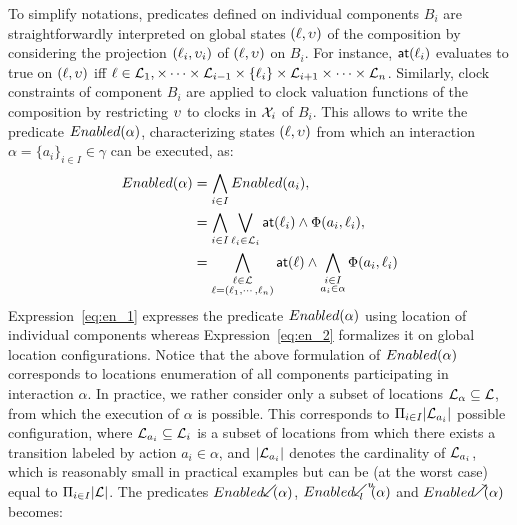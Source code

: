 To simplify notations, predicates defined on individual components $B_i$ are
straightforwardly interpreted on global states $(\ell,\upsilon)$ of the composition
by considering the projection $(\ell_i,\upsilon_i)$ of $(\ell,\upsilon)$ on $B_i$.
For instance, $\textsf{at}(\ell_i)$ evaluates to true on $(\ell,\upsilon)$ iff
$\ell\in\mathcal{L}_1,\times\cdots\times\mathcal{L}_{i-1}\times\{\ell_i\}\times\mathcal{L}_{i+1}\times
\cdots\times\mathcal{L}_n$. Similarly, clock constraints of component $B_i$ are applied to clock 
valuation functions of the composition
by restricting $\upsilon$ to clocks in $\mathcal{X}_i$ of $B_i$. This allows to write
the predicate $Enabled(\alpha)$, characterizing states $(\ell,\upsilon)$ from which 
an interaction $\alpha=\{a_i\}_{i\in{I}}\in\gamma$ can be executed, as:
\begin{align}\label{eq:en}
  Enabled(\alpha)&=\bigwedge_{i\in{I}}Enabled(a_i),\\
                  &=\bigwedge_{i\in{I}}\bigvee_{\ell_i\in\mathcal{L}_i}\textsf{at}(\ell_i)\wedge
                  \Phi(a_i,\ell_i),\label{eq:en_1}\\
                  &=\bigwedge_{\substack{\ell\in\mathcal{L}\\ 
                  \ell=(\ell_1,\cdots,\ell_n)}}\textsf{at}(\ell)\wedge
                  \bigwedge_{\substack{i\in I\\ a_i\in\alpha }}\Phi(a_i,\ell_i)\label{eq:en_2}
\end{align}
Expression~\ref{eq:en_1} expresses the predicate $Enabled(\alpha)$ using location of individual
components whereas Expression~\ref{eq:en_2} formalizes it on global location configurations.
Notice that the above formulation of $Enabled(\alpha)$ corresponds to locations 
enumeration of all components participating in interaction $\alpha$. In practice,
we rather consider only a subset of locations $\mathcal{L}_{\alpha}\subseteq\mathcal{L}$, from
which the execution of $\alpha$ is possible. This corresponds to $\Pi_{i\in{I}}
|\mathcal{L}_{a_i}|$ possible configuration, where $\mathcal{L}_{a_i}\subseteq\mathcal{L}_i$ is a subset
of locations from which there exists a transition labeled by action $a_i\in\alpha$,
and $|\mathcal{L}_{a_i}|$ denotes the cardinality of $\mathcal{L}_{a_i}$, which is reasonably
small in practical examples but can be (at the worst case) equal to $\Pi_{i\in{I}}
|\mathcal{L}|$. The predicates $\enabledbackward{\alpha}$, 
$\enabledbackwardb{\alpha}{l}{u}$ and $\enabledforward{\alpha}$ becomes:

